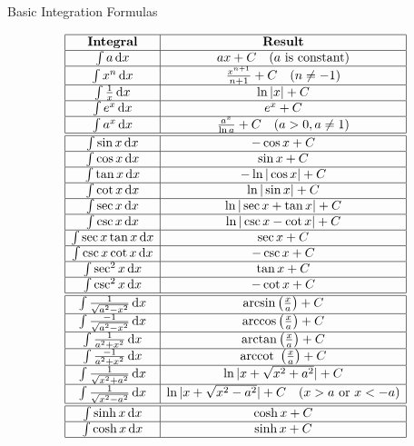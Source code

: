 \documentclass[11pt]{../../TexTemplate/elegantbook}
\begin{document}
\begin{leftbarTitle}{Basic Integration Formulas}\end{leftbarTitle}
\[
\begin{array}{|c|c|}
\hline
\textbf{Integral} & \textbf{Result} \\
\hline
\int a \, \mathrm{d}x & ax + C \quad (a \text{ is constant}) \\
\hline
\int x^n \, \mathrm{d}x & \frac{x^{n+1}}{n+1} + C \quad (n \neq -1) \\
\hline
\int \frac{1}{x} \, \mathrm{d}x & \ln|x| + C \\
\hline
\int e^x \, \mathrm{d}x & e^x + C \\
\hline
\int a^x \, \mathrm{d}x & \frac{a^x}{\ln a} + C \quad (a > 0, a \neq 1) \\
\hline
\hline
\int \sin x \, \mathrm{d}x & -\cos x + C \\
\hline
\int \cos x \, \mathrm{d}x & \sin x + C \\
\hline
\int \tan x \, \mathrm{d}x & -\ln|\cos x| + C \\
\hline
\int \cot x \, \mathrm{d}x & \ln|\sin x| + C \\
\hline
\int \sec x \, \mathrm{d}x & \ln|\sec x + \tan x| + C \\
\hline
\int \csc x \, \mathrm{d}x & \ln|\csc x - \cot x| + C \\
\hline
\int \sec x \tan x \, \mathrm{d}x & \sec x + C \\
\hline
\int \csc x \cot x \, \mathrm{d}x & -\csc x + C \\
\hline
\int \sec^2 x \, \mathrm{d}x & \tan x + C \\
\hline
\int \csc^2 x \, \mathrm{d}x & -\cot x + C \\
\hline
\hline
\int \frac{1}{\sqrt{a^{2}-x^2}} \, \mathrm{d}x & \arcsin \left( \frac{x}{a} \right) + C \\
\hline
\int \frac{-1}{\sqrt{a^{2}-x^2}} \, \mathrm{d}x & \arccos \left( \frac{x}{a} \right) + C \\
\hline
\int \frac{1}{a^{2}+x^2} \, \mathrm{d}x & \arctan \left( \frac{x}{a} \right) + C \\
\hline
\int \frac{-1}{a^{2}+x^2} \, \mathrm{d}x & \text{arccot } \left( \frac{x}{a} \right) + C \\
\hline
\int \frac{1}{\sqrt{x^2+a^{2}}} \, \mathrm{d}x & \ln|x + \sqrt{x^2+a^{2}}| + C \\
\hline
\int \frac{1}{\sqrt{x^2-a^{2}}} \, \mathrm{d}x & \ln|x + \sqrt{x^2-a^{2}}| + C \quad (x > a \text{ or } x < -a) \\
\hline
\hline
\int \sinh x \, \mathrm{d}x & \cosh x + C \\
\hline
\int \cosh x \, \mathrm{d}x & \sinh x + C \\
\hline
\end{array}
\]
\end{document}
